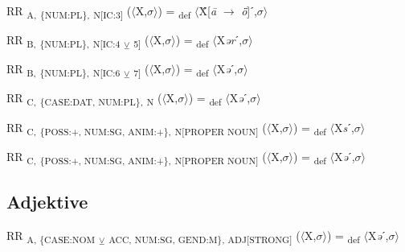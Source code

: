 {\begin{exe}
 RR \textsubscript{A,} \textsubscript{\{NUM:PL\},} \textsubscript{N[IC:3]} ($\langle$X,$\sigma $$\rangle$) = \textsubscript{def} $\langle$Ẍ[\textit{\=a} $\rightarrow$ \textit{ȫ}]ˊ,$\sigma $$\rangle$
\end{exe}

\begin{exe}
 RR \textsubscript{B,} \textsubscript{\{NUM:PL\},} \textsubscript{N[IC:4} \textsubscript{${\veebar}$}\textsubscript{ 5]} ($\langle$X,$\sigma $$\rangle$) = \textsubscript{def} $\langle$X\textit{ər}ˊ,$\sigma $$\rangle$
\end{exe}

\begin{exe}
 RR \textsubscript{B,} \textsubscript{\{NUM:PL\},} \textsubscript{N[IC:6} \textsubscript{${\veebar}$}\textsubscript{ 7]} ($\langle$X,$\sigma $$\rangle$) = \textsubscript{def} $\langle$X\textit{ə}ˊ,$\sigma $$\rangle$
\end{exe}

\begin{exe}
 RR \textsubscript{C,} \textsubscript{\{CASE:DAT, NUM:PL\},} \textsubscript{N} ($\langle$X,$\sigma $$\rangle$) = \textsubscript{def} $\langle$X\textit{ə}ˊ,$\sigma $$\rangle$
\end{exe}

\begin{exe}
 RR \textsubscript{C,} \textsubscript{\{POSS:+, NUM:SG, ANIM:+\},} \textsubscript{N[PROPER NOUN]} ($\langle$X,$\sigma $$\rangle$) = \textsubscript{def} $\langle$X\textit{s}ˊ,$\sigma $$\rangle$
\end{exe}

\begin{exe}
 RR \textsubscript{C,} \textsubscript{\{POSS:+, NUM:SG, ANIM:+\},} \textsubscript{N[PROPER NOUN]} ($\langle$X,$\sigma $$\rangle$) = \textsubscript{def} $\langle$X\textit{ə}ˊ,$\sigma $$\rangle$
\end{exe}

\subsection{Adjektive}

\begin{exe}
 RR \textsubscript{A, \{CASE:NOM} \textsubscript{${\veebar}$}\textsubscript{ ACC, NUM:SG, GEND:M\}, ADJ[STRONG]} ($\langle$X,$\sigma $$\rangle$) = \textsubscript{def} $\langle$X\textit{ə}ˊ,$\sigma $$\rangle$
\end{exe}

}
